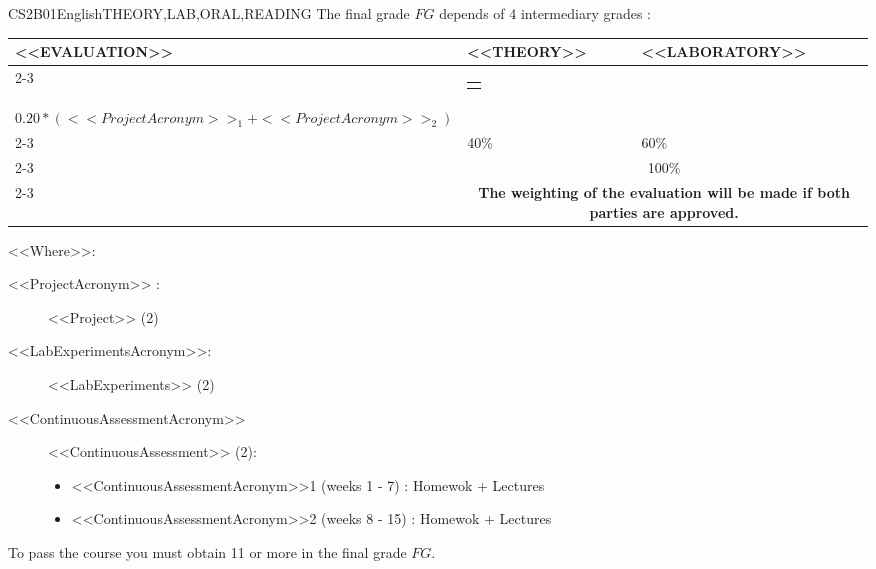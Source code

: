   \begin{evaluation}{CS2B01}{English}{THEORY,LAB,ORAL,READING}
  The final grade $FG$ depends of 4 intermediary grades :
 
  \begin{tabularx}{0.9\textwidth}{|X|p{}|p{}|} \hline
  \multirow{4}{*}{\uppercase{<<Evaluation>>}} & \uppercase{<<Theory>>} & \uppercase{<<Laboratory>>} \\ \cline{2-3}
  & %
      \begin{minipage}{0.95\textwidth}
      \begin{tabular}{l}
        $0.20*(<<ContinuousAssessmentAcronym>>_{1} + <<ContinuousAssessmentAcronym>>_{2})$ 
        \end{tabular} 
      \end{minipage} 
  & %
      \begin{minipage}{0.95\textwidth}
      \begin{tabular}{l}
        $0.10*(<<LabExperimentsAcronym>>_{2} + <<LabExperimentsAcronym>>_{3})$ + \\
        $0.20*(<<ProjectAcronym>>_{1} + <<ProjectAcronym>>_{2})$
      \end{tabular} 
      \end{minipage}                 \\ \cline{2-3}
  
  & %
  40\% 
  & %
  60\% \\ \cline{2-3}
  & \multicolumn{2}{c|}{100\%}  \\ \cline{2-3}
  & \multicolumn{2}{c|}{\textbf{The weighting of the evaluation will be made if both parties are approved.}}  \\ \hline
  \end{tabularx}
    
  \vspace{2mm}
  \noindent <<Where>>:
  \begin{description}
    \item[<<ProjectAcronym>> :] <<Project>> (2)
    \item[<<LabExperimentsAcronym>>:] <<LabExperiments>> (2)
    \item[<<ContinuousAssessmentAcronym>>] <<ContinuousAssessment>> (2):
    \begin{itemize}
          \item <<ContinuousAssessmentAcronym>>1 (weeks 1 - 7) : Homewok + Lectures
          \item <<ContinuousAssessmentAcronym>>2 (weeks 8 - 15) : Homewok + Lectures
    \end{itemize}
  \end{description}
  
  \noindent To pass the course you must obtain 11 or more in the final grade $FG$.
  \end{evaluation}



